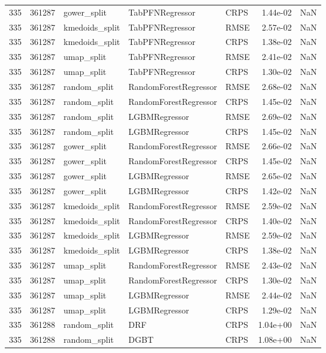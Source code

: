\begin{tabular}{rrlllrr}
335 & 361287 & gower\_split & TabPFNRegressor & CRPS & 1.44e-02 & NaN \\
335 & 361287 & kmedoids\_split & TabPFNRegressor & RMSE & 2.57e-02 & NaN \\
335 & 361287 & kmedoids\_split & TabPFNRegressor & CRPS & 1.38e-02 & NaN \\
335 & 361287 & umap\_split & TabPFNRegressor & RMSE & 2.41e-02 & NaN \\
335 & 361287 & umap\_split & TabPFNRegressor & CRPS & 1.30e-02 & NaN \\
335 & 361287 & random\_split & RandomForestRegressor & RMSE & 2.68e-02 & NaN \\
335 & 361287 & random\_split & RandomForestRegressor & CRPS & 1.45e-02 & NaN \\
335 & 361287 & random\_split & LGBMRegressor & RMSE & 2.69e-02 & NaN \\
335 & 361287 & random\_split & LGBMRegressor & CRPS & 1.45e-02 & NaN \\
335 & 361287 & gower\_split & RandomForestRegressor & RMSE & 2.66e-02 & NaN \\
335 & 361287 & gower\_split & RandomForestRegressor & CRPS & 1.45e-02 & NaN \\
335 & 361287 & gower\_split & LGBMRegressor & RMSE & 2.65e-02 & NaN \\
335 & 361287 & gower\_split & LGBMRegressor & CRPS & 1.42e-02 & NaN \\
335 & 361287 & kmedoids\_split & RandomForestRegressor & RMSE & 2.59e-02 & NaN \\
335 & 361287 & kmedoids\_split & RandomForestRegressor & CRPS & 1.40e-02 & NaN \\
335 & 361287 & kmedoids\_split & LGBMRegressor & RMSE & 2.59e-02 & NaN \\
335 & 361287 & kmedoids\_split & LGBMRegressor & CRPS & 1.38e-02 & NaN \\
335 & 361287 & umap\_split & RandomForestRegressor & RMSE & 2.43e-02 & NaN \\
335 & 361287 & umap\_split & RandomForestRegressor & CRPS & 1.30e-02 & NaN \\
335 & 361287 & umap\_split & LGBMRegressor & RMSE & 2.44e-02 & NaN \\
335 & 361287 & umap\_split & LGBMRegressor & CRPS & 1.29e-02 & NaN \\
335 & 361288 & random\_split & DRF & CRPS & 1.04e+00 & NaN \\
335 & 361288 & random\_split & DGBT & CRPS & 1.08e+00 & NaN \\

\end{tabular}
